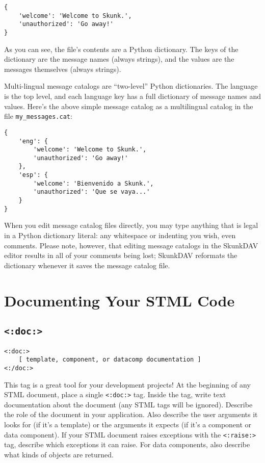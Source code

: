 \documentclass{manual}
\begin{document}
\begin{verbatim}
{
    'welcome': 'Welcome to Skunk.',
    'unauthorized': 'Go away!'
}
\end{verbatim}


As you can see, the file's contents are a
Python dictionary. The keys of the dictionary
are the message names (always strings), and
the values are the messages themselves (always
strings).

Multi-lingual message catalogs are ``two-level''
Python dictionaries. The language is the top level,
and each language key has a full dictionary of 
message names and values. Here's the above simple
message catalog as a multilingual catalog in
the file \texttt{my_messages.cat}:

\begin{verbatim}
{
    'eng': {
        'welcome': 'Welcome to Skunk.',
        'unauthorized': 'Go away!'
    },
    'esp': {
        'welcome': 'Bienvenido a Skunk.',
        'unauthorized': 'Que se vaya...'
    }
}
\end{verbatim}


When you edit message catalog files directly,
you may type anything that is legal in a Python
dictionary literal: any whitespace or indenting you wish,
even comments. Please note, however, that editing
message catalogs in the SkunkDAV editor results in 
all of your comments being lost; SkunkDAV
reformats the dictionary whenever it saves the
message catalog file.

\chapter{Documenting Your STML Code}
\label{stmlrefmisc}



\section{\texttt{<:doc:>}}
\label{tagdoc}

\begin{verbatim}<:doc:>
    [ template, component, or datacomp documentation ]
<:/doc:>
\end{verbatim}


This tag is a great tool for your development projects!
At the beginning of any STML document,
place a single \texttt{<:doc:>} tag. Inside the tag,
write text documentation about the document (any STML tags will
be ignored). Describe the role of the document in your application.
Also describe the user arguments it looks for (if it's a template)
or the arguments it expects (if it's a component or data component).
If your STML document raises exceptions with the \texttt{<:raise:>}
tag, describe which exceptions it can raise.
For data components, also describe what kinds of objects are returned.
\end{document}
